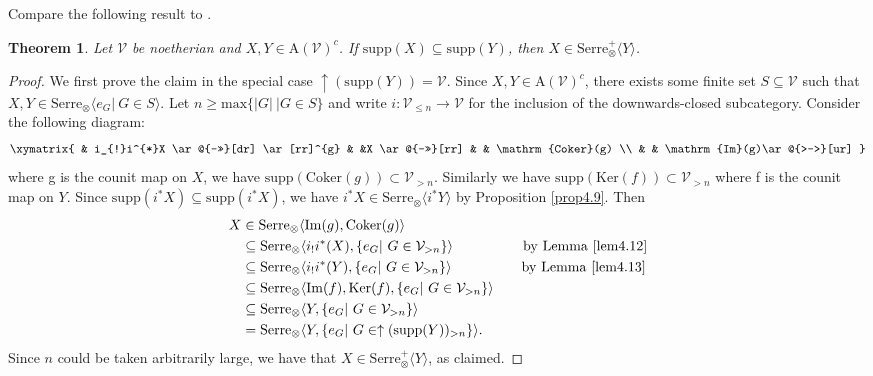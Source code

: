\documentclass[11pt,a4paper]{amsart}
\numberwithin{equation}{section} \theoremstyle{plain}
\newtheorem{thm}[lem]{Theorem}
\begin{document}
Compare the following result to \cite[Proposition 5.8]{BBP+25b}.
\begin{thm}\label{thm 4.15} Let $\mathcal{V}$ be noetherian and $X, Y\in \mathrm{A}(\mathcal{V})^{c}$. If $\mathrm{supp}(X)\subseteq \mathrm{supp}(Y)$, then $X\in \mathrm{Serre}_{\otimes}^{+}\langle Y\rangle$.
\end{thm}
\begin{proof} We first prove the claim in the special case $\uparrow(\mathrm{supp}(Y))=\mathcal{V}$. Since $X, Y\in \mathrm{A}(\mathcal{V})^{c}$, there exists some finite set $S\subseteq \mathcal{V}$ such that $X,Y\in \mathrm{Serre}_{\otimes}\langle e_{G}|~G\in S\rangle$. Let $n\geq \mathrm{max}\{|G|~|G\in S\}$ and write $i:\mathcal{V}_{\leq n}\rightarrow \mathcal{V}$ for the inclusion of the downwards-closed subcategory. Consider the following diagram:$$\xymatrix{
                & i_{!}i^{*}X \ar@{->>}[dr] \ar[rr]^{g} & &X  \ar@{->>}[rr] & & \mathrm{Coker}(g)        \\
 & &      \mathrm{Im}(g)\ar@{>->}[ur]       }
$$where g is the counit map on $X$, we have $\mathrm{supp}(\mathrm{Coker}(g))\subset \mathcal{V}_{>n}$. Similarly we have $\mathrm{supp}(\mathrm{Ker}(f))\subset \mathcal{V}_{>n}$ where f is the counit map on $Y$. Since $\mathrm{supp}(i^{*}X)\subseteq \mathrm{supp}(i^{*}X)$, we have $i^{*}X\in \mathrm{Serre}_{\otimes}\langle i^{*}Y\rangle$ by Proposition \ref{prop4.9}. Then \begin{align*}
  X &\in \mathrm{Serre}_{\otimes}\langle  \mathrm{Im}(g), \mathrm{Coker}(g) \rangle\\
  &\subseteq \mathrm{Serre}_{\otimes}\langle  i_{!}i^{*}(X), \{e_{G}|~G\in \mathcal{V}_{>n}\} \rangle \quad\quad\quad\quad\quad \mathrm{by~Lemma~\ref{lem4.12}}\\
  &\subseteq \mathrm{Serre}_{\otimes}\langle  i_{!}i^{*}(Y), \{e_{G}|~G\in \mathcal{V}_{>n}\} \rangle \quad\quad\quad\quad\quad \mathrm{by~Lemma~\ref{lem4.13}}\\
  &\subseteq \mathrm{Serre}_{\otimes}\langle  \mathrm{Im}(f),\mathrm{Ker}(f), \{e_{G}|~G\in \mathcal{V}_{>n}\} \rangle \\
  &\subseteq \mathrm{Serre}_{\otimes}\langle  Y, \{e_{G}|~G\in \mathcal{V}_{>n}\} \rangle \\
  &= \mathrm{Serre}_{\otimes}\langle  Y, \{e_{G}|~G\in \uparrow(\mathrm{supp}(Y))_{>n}\} \rangle .
\end{align*}
Since $n$ could be taken arbitrarily large, we have that $X\in \mathrm{Serre}_{\otimes}^{+}\langle Y\rangle$, as claimed.


\end{proof}
\end{document}
